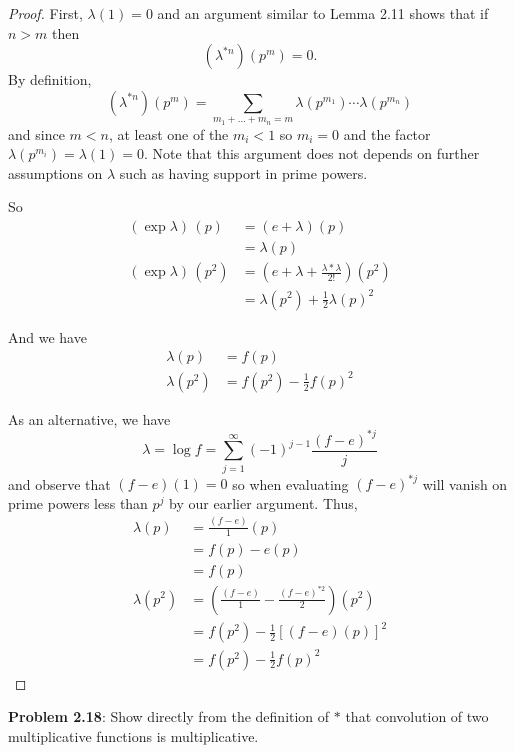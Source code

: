 \documentclass{article}
\begin{document}
\begin{proof}
First, $\lambda(1) = 0$ and an argument similar to Lemma 2.11 shows that if $n > m$ then
$$(\lambda^{* n})(p^m) = 0.$$
By definition,
$$(\lambda^{* n})(p^m) = \sum_{m_1 + ... + m_n = m} \lambda(p^{m_1}) \cdots \lambda(p^{m_n})$$
and since $m < n$, at least one of the $m_i < 1$ so $m_i = 0$ and the factor $\lambda(p^{m_i}) = \lambda(1) = 0$. Note that this argument does not depends on further assumptions on $\lambda$ such as having support in prime powers.

So
\begin{align*}
(\exp \lambda) \, (p) &= (e + \lambda)(p)\\
&= \lambda(p)\\
(\exp \lambda) \, (p^2) &= \left( e + \lambda + \frac{\lambda * \lambda}{2!} \right) (p^2)\\
&= \lambda(p^2) + \frac{1}{2} \lambda(p)^2
\end{align*}

And we have
\begin{align*}
\lambda(p) &= f(p)\\
\lambda(p^2) &= f(p^2) - \frac{1}{2} f(p)^2
\end{align*}

As an alternative, we have
$$\lambda = \log f = \sum_{j=1}^{\infty} (-1)^{j-1} \frac{(f - e)^{*j}}{j}$$
and observe that $(f - e)(1) = 0$ so when evaluating $(f - e)^{*j}$ will vanish on prime powers less than $p^j$ by our earlier argument. Thus,
\begin{align*}
\lambda(p) &= \frac{(f - e)}{1} (p)\\
&= f(p) - e(p)\\
&= f(p)\\
\lambda(p^2) &= \left( \frac{(f - e)}{1} - \frac{(f - e)^{*2}}{2} \right) (p^2)\\
&= f(p^2) - \frac{1}{2} [(f - e)(p)]^2\\
&= f(p^2) - \frac{1}{2} f(p)^2
\end{align*}
\end{proof}

\textbf{Problem 2.18}: Show directly from the definition of $*$ that convolution of two multiplicative functions is multiplicative.
\end{document}
